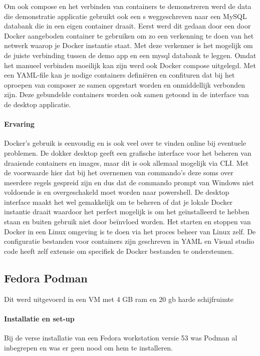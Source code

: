 Om ook compose en het verbinden van containers te demonstreren werd de data die demonstratie applicatie gebruikt ook een s weggeschreven naar een MySQL databank die in een eigen container draait. Eerst werd dit gedaan door een door Docker aangeboden container te gebruiken om zo een verkenning te doen van het netwerk waarop je Docker instantie staat. Met deze verkenner is het mogelijk om de juiste verbinding tussen de demo app en een mysql databank te leggen. Omdat het manueel verbinden moeilijk kan zijn werd ook Docker compose uitgelegd. Met een YAML-file kan je nodige containers definiëren en confituren dat bij het oproepen van composer ze samen opgestart worden en onmiddellijk verbonden zijn. Deze gebundelde containers worden ook samen getoond in de interface van de desktop applicatie.


\paragraph{Ervaring}
Docker’s gebruik is eenvoudig en is ook veel over te vinden online bij eventuele problemen.  De dokker desktop geeft een grafische interface voor het beheren van draaiende containers en images, maar dit is ook allemaal mogelijk via CLI. Met de voorwaarde hier dat bij het overnemen van commando’s deze soms over meerdere regels gespreid zijn en dus dat de commando prompt van Windows niet voldoende is en overgeschakeld moet worden naar powershell.  De desktop interface maakt het wel gemakkelijk om te beheren of dat je lokale Docker instantie draait waardoor het perfect mogelijk is om het geïnstalleerd te hebben staan en buiten gebruik niet door beïnvloed worden. Het starten en stoppen van Docker in een Linux omgeving is te doen via het proces beheer van Linux zelf.  De configuratie bestanden voor containers zijn geschreven in YAML en Visual studio code heeft zelf extensie om specifiek de Docker bestanden te ondersteunen.

\subsection{Fedora Podman}
Dit werd uitgevoerd in een VM met 4 GB ram en 20 gb harde schijfruimte
\paragraph{Installatie en set-up}
Bij de verse installatie van een Fedora workstation versie 53 was Podman al inbegrepen en was er geen nood om hem te installeren.


